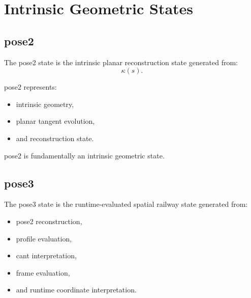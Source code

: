 \section{Intrinsic Geometric States}

\subsection{pose2}

\begin{definition}
\label{def:taxonomy-pose2}
The pose2 state is the intrinsic planar reconstruction state generated
from:
\[
\kappa(s).
\]
\end{definition}

\begin{remark}
pose2 represents:
\begin{itemize}
\item intrinsic geometry,
\item planar tangent evolution,
\item and reconstruction state.
\end{itemize}
\end{remark}

\begin{remark}
pose2 is fundamentally an intrinsic geometric state.
\end{remark}


\subsection{pose3}

\begin{definition}
\label{def:taxonomy-pose3}
The pose3 state is the runtime-evaluated spatial railway state generated
from:
\begin{itemize}
\item pose2 reconstruction,
\item profile evaluation,
\item cant interpretation,
\item frame evaluation,
\item and runtime coordinate interpretation.
\end{itemize}
\end{definition}

